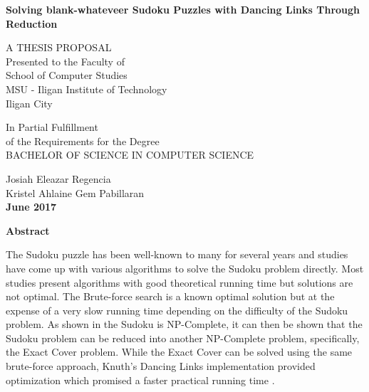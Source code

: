 \documentclass[a4paper,oneside,11pt]{report}
\begin{document}
\thispagestyle{empty}
\singlespacing
\begin{center}

{\bf\Large Solving blank-whateveer Sudoku Puzzles with Dancing Links Through Reduction }\\


\vspace{\fill}

{A THESIS PROPOSAL}\\[.25in]

{Presented to the Faculty of\\
School of Computer Studies\\
MSU - Iligan Institute of Technology\\
Iligan City}

\vspace{\fill}

{In Partial Fulfillment\\
of the Requirements for the Degree\\
BACHELOR OF SCIENCE IN COMPUTER SCIENCE}\\

\vspace{\fill}

{Josiah Eleazar Regencia\\
Kristel Ahlaine Gem Pabillaran}\\
{\bf June 2017}

\end{center}

\newpage
\doublespacing
{}
\begin{center}
 \textbf{\Large Abstract}
\end{center}
\vspace{0.8cm}

The Sudoku puzzle has been well-known to many for several years and studies have come up with various algorithms to solve the Sudoku problem directly. Most studies present algorithms with good theoretical running time but solutions are not optimal. The Brute-force search is a known optimal solution but at the expense of a very slow running time depending on the difficulty of the Sudoku problem. As shown in \cite{Yato} the Sudoku is NP-Complete, it can then be shown that the Sudoku problem can be reduced into another NP-Complete problem, specifically, the Exact Cover problem. While the Exact Cover can be solved using the same brute-force approach, Knuth's Dancing Links implementation provided optimization which promised a faster practical running time \cite{Knuth}.
\end{document}
